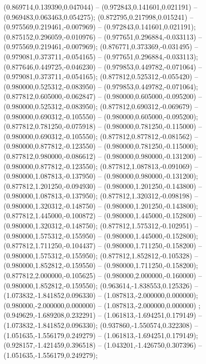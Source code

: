  (0.869714,0.139390,0.047044) -- (0.972843,0.141601,0.021191) -- (0.969483,0.063463,0.054275);
 (0.872795,0.217998,0.015241) -- (0.975569,0.219461,-0.007969) -- (0.972843,0.141601,0.021191);
 (0.875152,0.296059,-0.010976) -- (0.977651,0.296884,-0.033113) -- (0.975569,0.219461,-0.007969);
 (0.876771,0.373369,-0.031495) -- (0.979081,0.373711,-0.054165) -- (0.977651,0.296884,-0.033113);
 (0.877646,0.449725,-0.046230) -- (0.979853,0.449782,-0.071064) -- (0.979081,0.373711,-0.054165);
 (0.877812,0.525312,-0.055420) -- (0.980000,0.525312,-0.083950) -- (0.979853,0.449782,-0.071064);
 (0.877812,0.605000,-0.062847) -- (0.980000,0.605000,-0.095200) -- (0.980000,0.525312,-0.083950);
 (0.877812,0.690312,-0.069679) -- (0.980000,0.690312,-0.105550) -- (0.980000,0.605000,-0.095200);
 (0.877812,0.781250,-0.075918) -- (0.980000,0.781250,-0.115000) -- (0.980000,0.690312,-0.105550);
 (0.877812,0.877812,-0.081562) -- (0.980000,0.877812,-0.123550) -- (0.980000,0.781250,-0.115000);
 (0.877812,0.980000,-0.086612) -- (0.980000,0.980000,-0.131200) -- (0.980000,0.877812,-0.123550);
 (0.877812,1.087813,-0.091069) -- (0.980000,1.087813,-0.137950) -- (0.980000,0.980000,-0.131200);
 (0.877812,1.201250,-0.094930) -- (0.980000,1.201250,-0.143800) -- (0.980000,1.087813,-0.137950);
 (0.877812,1.320312,-0.098198) -- (0.980000,1.320312,-0.148750) -- (0.980000,1.201250,-0.143800);
 (0.877812,1.445000,-0.100872) -- (0.980000,1.445000,-0.152800) -- (0.980000,1.320312,-0.148750);
 (0.877812,1.575312,-0.102951) -- (0.980000,1.575312,-0.155950) -- (0.980000,1.445000,-0.152800);
 (0.877812,1.711250,-0.104437) -- (0.980000,1.711250,-0.158200) -- (0.980000,1.575312,-0.155950);
 (0.877812,1.852812,-0.105328) -- (0.980000,1.852812,-0.159550) -- (0.980000,1.711250,-0.158200);
 (0.877812,2.000000,-0.105625) -- (0.980000,2.000000,-0.160000) -- (0.980000,1.852812,-0.159550);
 (0.963614,-1.838553,0.125326) -- (1.073832,-1.841852,0.096330) -- (1.087813,-2.000000,0.000000);
 (0.980000,-2.000000,0.000000) -- (1.087813,-2.000000,0.000000) ;
 (0.949629,-1.689208,0.232291) -- (1.061813,-1.694251,0.179149) -- (1.073832,-1.841852,0.096330);
 (0.937860,-1.550574,0.322308) -- (1.051635,-1.556179,0.249279) -- (1.061813,-1.694251,0.179149);
 (0.928157,-1.421459,0.396518) -- (1.043201,-1.426750,0.307396) -- (1.051635,-1.556179,0.249279);
